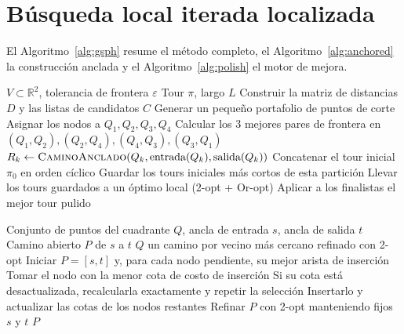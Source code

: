 \documentclass[runningheads]{llncs}
\begin{document}
\section{Búsqueda local iterada localizada}
\label{sec:engine}

El Algoritmo~\ref{alg:gsph} resume el método completo, el
Algoritmo~\ref{alg:anchored} la construcción anclada y el
Algoritmo~\ref{alg:polish} el motor de mejora.

\begin{algorithm}
\caption{GSPH-FC --- procedimiento completo}
\label{alg:gsph}
\begin{algorithmic}[1]
\Require $V\subset\mathbb{R}^2$, tolerancia de frontera $\varepsilon$
\Ensure Tour $\pi$, largo $L$
\State Construir la matriz de distancias $D$ y las listas de candidatos $C$
\State Generar un pequeño portafolio de puntos de corte
  \State Asignar los nodos a $Q_1,Q_2,Q_3,Q_4$
  \State Calcular los 3 mejores pares de frontera en
         $(Q_1,Q_2),(Q_2,Q_4),(Q_4,Q_3),(Q_3,Q_1)$
      \State $R_k\gets\Call{CaminoAnclado}{Q_k,\text{entrada}(Q_k),\text{salida}(Q_k)}$
    \EndFor
    \State Concatenar el tour inicial $\pi_0$ en orden cíclico
  \EndFor
  \State Guardar los tours iniciales más cortos de esta partición
\EndFor
\State Llevar los tours guardados a un óptimo local (2-opt + Or-opt)
\State Aplicar  a los finalistas
\State \Return el mejor tour pulido
\end{algorithmic}
\end{algorithm}

\begin{algorithm}
\caption{\textsc{CaminoAnclado} --- construcción anclada dentro de un cuadrante}
\label{alg:anchored}
\begin{algorithmic}[1]
\Require Conjunto de puntos del cuadrante $Q$, ancla de entrada $s$, ancla de salida $t$
\Ensure Camino abierto $P$ de $s$ a $t$
  \State \Return $Q$
\EndIf
{}
  \State \Return un camino por vecino más cercano refinado con 2-opt
\EndIf
\State Iniciar $P=[s,t]$ y, para cada nodo pendiente, su mejor arista de inserción
  \State Tomar el nodo con la menor cota de costo de inserción
  \State Si su cota está desactualizada, recalcularla exactamente y repetir la selección
  \State Insertarlo y actualizar las cotas de los nodos restantes
\EndWhile
\State Refinar $P$ con 2-opt manteniendo fijos $s$ y $t$
\State \Return $P$
\end{algorithmic}
\end{algorithm}
\end{document}
